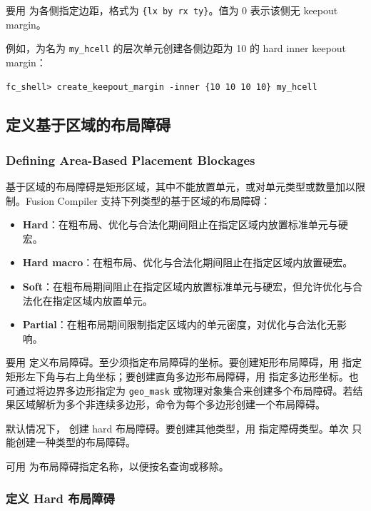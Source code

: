 要用  为各侧指定边距，格式为 \texttt{\{lx by rx ty\}}。值为 0 表示该侧无 keepout margin。

例如，为名为 \texttt{my\_hcell} 的层次单元创建各侧边距为 10 的 hard inner keepout margin：
\begin{lstlisting}
fc_shell> create_keepout_margin -inner {10 10 10 10} my_hcell
\end{lstlisting}

\subsection{定义基于区域的布局障碍}
\subsubsection*{Defining Area-Based Placement Blockages}

基于区域的布局障碍是矩形区域，其中不能放置单元，或对单元类型或数量加以限制。Fusion Compiler 支持下列类型的基于区域的布局障碍：
\begin{itemize}
  \item \textbf{Hard}：在粗布局、优化与合法化期间阻止在指定区域内放置标准单元与硬宏。
  \item \textbf{Hard macro}：在粗布局、优化与合法化期间阻止在指定区域内放置硬宏。
  \item \textbf{Soft}：在粗布局期间阻止在指定区域内放置标准单元与硬宏，但允许优化与合法化在指定区域内放置单元。
  \item \textbf{Partial}：在粗布局期间限制指定区域内的单元密度，对优化与合法化无影响。
\end{itemize}

要用  定义布局障碍。至少须指定布局障碍的坐标。要创建矩形布局障碍，用  指定矩形左下角与右上角坐标；要创建直角多边形布局障碍，用  指定多边形坐标。也可通过将边界多边形指定为 \texttt{geo\_mask} 或物理对象集合来创建多个布局障碍。若结果区域解析为多个非连续多边形，命令为每个多边形创建一个布局障碍。

默认情况下， 创建 hard 布局障碍。要创建其他类型，用  指定障碍类型。单次  只能创建一种类型的布局障碍。

可用  为布局障碍指定名称，以便按名查询或移除。

\subsubsection{定义 Hard 布局障碍}
